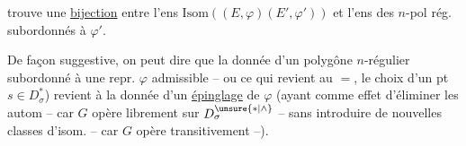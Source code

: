 trouve une \uline{bijection}  entre l'ens   $\mathrm{Isom}((E,\varphi)(E',\varphi'))$ et l'ens des $n$-pol rég.  subordonnés à $\varphi'$.

De façon suggestive, on peut dire que la donnée d'un polygône $n$-régulier subordonné à une repr. $\varphi$ admissible -- ou ce qui revient au $=$, le choix d'un pt $s\in D_\sigma^*$) revient à la donnée d'un \uline{épinglage} de $\varphi$ (ayant comme effet d'éliminer les autom -- car $G$ opère librement sur $D_\sigma^{\unsure{*|\wedge}}$ -- sans introduire de nouvelles classes d'isom. -- car $G$ opère transitivement --).
